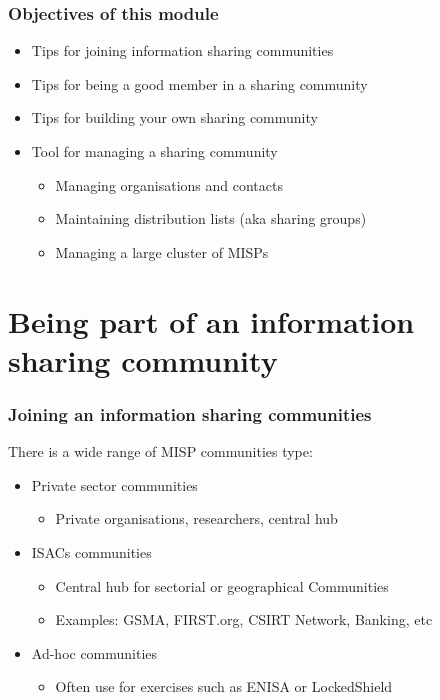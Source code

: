 
\begin{frame}[t,plain]
    \titlepage
\end{frame}

\begin{frame}
    \frametitle{Objectives of this module}
    \begin{itemize}
        \item Tips for joining information sharing communities
        \item Tips for being a good member in a sharing community
        \item Tips for building your own sharing community
        \item Tool for managing a sharing community
        \begin{itemize}
            \item Managing organisations and contacts
            \item Maintaining distribution lists (aka sharing groups)
            \item Managing a large cluster of MISPs
        \end{itemize}
    \end{itemize}
\end{frame}

\section{Being part of an information sharing community}
\begin{frame}
    \frametitle{Joining an information sharing communities}
    There is a wide range of MISP communities type:
    \begin{itemize}
        \item Private sector communities
        \begin{itemize}
            \item Private organisations, researchers, central hub
        \end{itemize}
        \item ISACs communities
        \begin{itemize}
            \item Central hub for sectorial or geographical Communities
            \item Examples: GSMA, FIRST.org, CSIRT Network, Banking, etc
        \end{itemize}
        \item Ad-hoc communities
        \begin{itemize}
            \item Often use for exercises such as ENISA or LockedShield
        \end{itemize}
    \end{itemize}
\end{frame}

